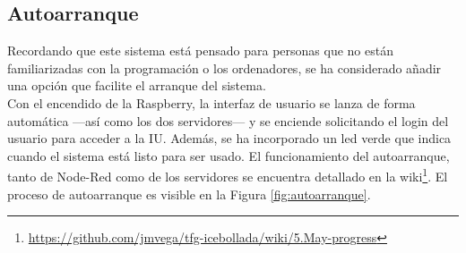 \subsection{Autoarranque}
Recordando que este sistema está pensado para personas que no están familiarizadas con la programación o los ordenadores, se ha considerado añadir una opción que facilite el arranque del sistema.\\

Con el encendido de la Raspberry, la interfaz de usuario se lanza de forma automática ---así como los dos servidores--- y se enciende solicitando el login del usuario para acceder a la IU. Además, se ha incorporado un led verde que indica cuando el sistema está listo para ser usado. El funcionamiento del autoarranque, tanto de Node-Red como de los servidores se encuentra detallado en la wiki\footnote{\url{https://github.com/jmvega/tfg-icebollada/wiki/5.May-progress}}. El proceso de autoarranque es visible en la Figura \ref{fig:autoarranque}.
